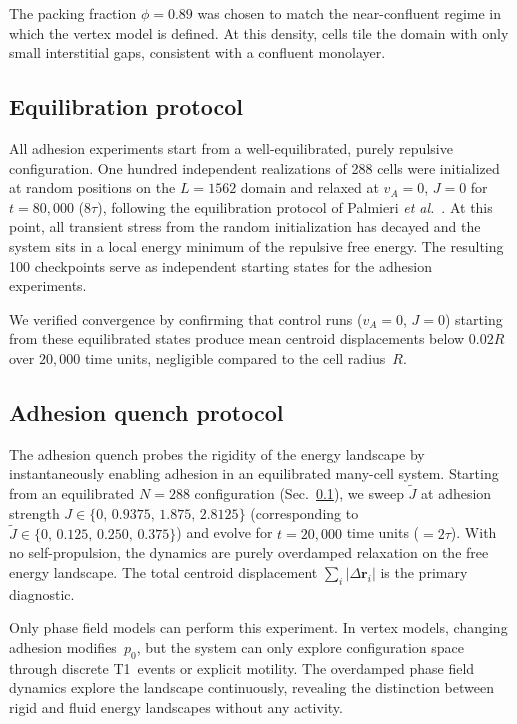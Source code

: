 \documentclass[aps,pre,twocolumn,superscriptaddress,longbibliography,floatfix]{revtex4-2}
\newcommand{\vA}{v_{\!A}}                  %
\newcommand{\Jt}{\tilde{J}}               %
\begin{document}
The packing fraction $\phi = 0.89$ was chosen to match the near-confluent
regime in which the vertex model is defined.  At this density, cells tile
the domain with only small interstitial gaps, consistent with a confluent
monolayer.

\subsection{Equilibration protocol}
\label{sec:methods:eq}

All adhesion experiments start from a well-equilibrated, purely repulsive
configuration.  One hundred independent realizations of 288 cells were
initialized at random positions on the $L = 1562$ domain and relaxed at
$\vA = 0$, $J = 0$ for $t = 80{,}000$ ($8\tau$), following the
equilibration protocol of Palmieri \textit{et al.}~\cite{Palmieri2015}.
At this point, all transient stress from the random initialization has
decayed and the system sits in a local energy minimum of the repulsive
free energy.  The resulting 100 checkpoints serve as independent starting
states for the adhesion experiments.

We verified convergence by confirming that control runs ($\vA = 0$,
$J = 0$) starting from these equilibrated states produce mean centroid
displacements below $0.02R$ over $20{,}000$ time units, negligible
compared to the cell radius~$R$.

\subsection{Adhesion quench protocol}
\label{sec:methods:quench}

The adhesion quench probes the rigidity of the energy landscape by
instantaneously enabling adhesion in an equilibrated many-cell system.
Starting from an equilibrated $N = 288$ configuration
(Sec.~\ref{sec:methods:eq}), we sweep
$\Jt$ at adhesion strength $J \in \{0,\, 0.9375,\, 1.875,\, 2.8125\}$
(corresponding to
$\Jt \in \{0,\, 0.125,\, 0.250,\, 0.375\}$)
and evolve for $t = 20{,}000$ time units ($= 2\tau$).  With no
self-propulsion, the dynamics are purely overdamped relaxation on the
free energy landscape.  The total centroid displacement
$\sum_i |\Delta\bm{r}_i|$ is the primary diagnostic.

Only phase field models can perform this experiment.  In vertex models,
changing adhesion modifies~$p_0$, but the system can only explore
configuration space through discrete T1~events or explicit motility.
The overdamped phase field dynamics explore the landscape continuously,
revealing the distinction between rigid and fluid energy landscapes
without any activity.
\end{document}
